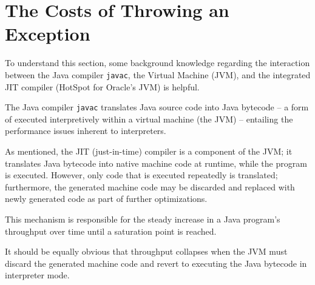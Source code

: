 \section{The Costs of Throwing an Exception}\label{sec:ExceptionCosts}
To understand this section, some background knowledge regarding the interaction between the Java compiler \texttt{javac}, the \Java Virtual Machine (JVM), and the integrated JIT compiler (HotSpot for Oracle's JVM) is helpful.

The Java compiler \texttt{javac} translates Java source code into Java bytecode ­– a form of  executed interpretively within a virtual machine (the JVM) ­– entailing the performance issues inherent to interpreters.

As mentioned, the JIT (just-in-time) compiler is a component of the JVM; it translates Java bytecode into native machine code at runtime, while the program is executed. However, only code that is executed repeatedly is translated; furthermore, the generated machine code may be discarded and replaced with newly generated code as part of further optimizations.

This mechanism is responsible for the steady increase in a Java program's throughput over time until a saturation point is reached.

It should be equally obvious that throughput collapses when the JVM must discard the generated machine code and revert to executing the Java bytecode in interpreter mode.


